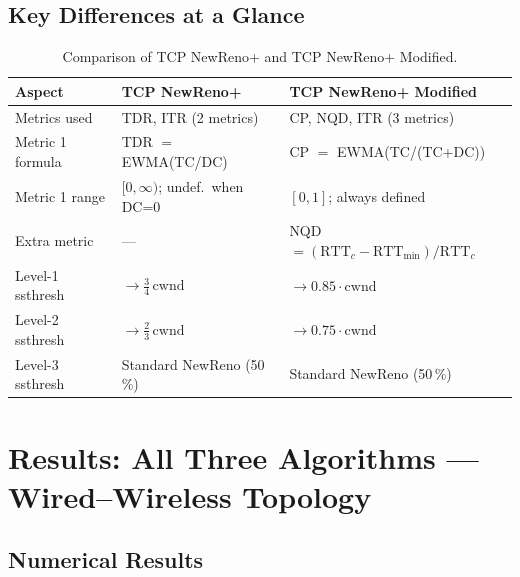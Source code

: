 \documentclass[12pt,a4paper]{article}
\begin{document}
\subsection{Key Differences at a Glance}

\begin{table}[H]
\centering
\caption{Comparison of TCP NewReno+ and TCP NewReno+ Modified.}
\label{tab:alg-compare}
\renewcommand{\arraystretch}{1.35}
\begin{tabular}{@{}lp{5.3cm}p{5.3cm}@{}}
\toprule
\textbf{Aspect} &
\textbf{TCP NewReno+} &
\textbf{TCP NewReno+ Modified} \\
\midrule
Metrics used & TDR, ITR (2 metrics) & CP, NQD, ITR (3 metrics) \\
Metric 1 formula & TDR $=$ EWMA(TC/DC) & CP $=$ EWMA(TC/(TC+DC)) \\
Metric 1 range & $[0,\infty)$; undef.\ when DC=0 & $[0,1]$; always defined \\
Extra metric & — & NQD $= (\text{RTT}_c - \text{RTT}_\text{min})/\text{RTT}_c$ \\
Level-1 ssthresh & $\to \frac{3}{4}\,\text{cwnd}$ & $\to 0.85\cdot\text{cwnd}$ \\
Level-2 ssthresh & $\to \frac{2}{3}\,\text{cwnd}$ & $\to 0.75\cdot\text{cwnd}$ \\
Level-3 ssthresh & Standard NewReno (50\,\%) & Standard NewReno (50\,\%) \\
\bottomrule
\end{tabular}
\end{table}

\section{Results: All Three Algorithms — Wired–Wireless Topology}
\label{sec:results-3way}

\subsection{Numerical Results}
\end{document}
